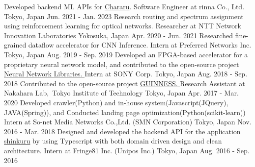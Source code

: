 
\begin{cventries}
  \eduentry
    {Developed backend ML APIs for \href{https://www.chararu.jp/}{Chararu}.} %
    {Software Engineer at rinna Co., Ltd.} %
    {Tokyo, Japan} %
    {Jun. 2021 - Jan.  2023} %
  \eduentry
    {Research routing and spectrum assignment using reinforcement learning for optical networks. } %
    {Researcher at NTT Network Innovation Laboratories} %
    {Yokosuka, Japan} %
    {Apr. 2020 - Jun. 2021} %
  \eduentry
    {Researched fine-grained dataflow accelerator for CNN Inference. } %
    {Intern at Preferred Networks Inc.} %
    {Tokyo, Japan} %
    {Aug. 2019 - Sep. 2019} %
  \eduentry
    {Developed an FPGA-based accelerator for a proprietary neural network model, and contributed to the open-source project \href{https://github.com/sony/nnabla}{Neural Network Libraries. }} %
    {Intern at SONY Corp.} %
    {Tokyo, Japan} %
    {Aug. 2018 - Sep. 2018} %
  \eduentry
    {Contributed to the open-source project \href{https://github.com/HirokiNakahara/GUINNESS}{GUINNESS. }} %
    {Research Assistant at Nakahara Lab,\ Tokyo Institute of Technology} 
    {Tokyo, Japan} %
    {Apr. 2017 - Mar. 2020} %
  \eduentry
    {Developed crawler(Python) and in-house system(Javascript(JQuery), JAVA(Spring)), and Conducted landing page optimization(Python(scikit-learn))} %
    {Intern at So-net Media Networks Co.,Ltd. (SMN Corporation)} %
    {Tokyo, Japan} %
    {Nov. 2016 - Mar. 2018} %
  \eduentry
    {Designed and developed the backend API for the application \href{https://apps.apple.com/jp/app/id1016332071?l=en}{shinkuru} by using Typescript with both domain driven design and clean architecture.} %
    {Intern at Fringe81 Inc. (Unipos Inc.)} %
    {Tokyo, Japan} %
    {Aug. 2016 - Sep. 2016} %
\end{cventries}
